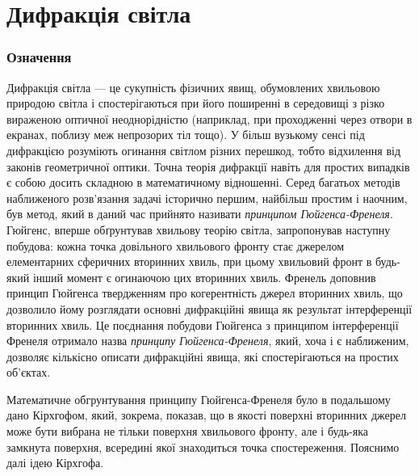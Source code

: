 
\part{Дифракція світла}

\nocite{akhmanov, Godzhaev}
\printbibliography[title={Рекомендована література}, heading=subbibliography]

\section{Означення}

Дифракція світла --- це сукупність фізичних явищ, обумовлених хвильовою природою світла і спостерігаються при його поширенні в середовищі з різко вираженою оптичної неоднорідністю (наприклад, при проходженні через отвори в екранах, поблизу меж непрозорих тіл тощо). У більш вузькому сенсі під дифракцією розуміють огинання світлом різних перешкод, тобто відхилення від законів геометричної оптики. Точна теорія дифракції навіть для простих випадків є собою досить складною в математичному відношенні. Серед багатьох методів наближеного розв'язання задачі історично першим, найбільш простим і наочним, був метод, який в даний час прийнято називати \emph{принципом Гюйгенса-Френеля}. Гюйгенс, вперше обґрунтував хвильову теорію світла, запропонував наступну побудова: кожна точка довільного хвильового фронту стає джерелом елементарних сферичних вторинних хвиль, при цьому хвильовий фронт в будь-який інший момент є огинаючою цих вторинних хвиль. Френель доповнив принцип Гюйгенса твердженням про когерентність джерел вторинних хвиль, що дозволило йому розглядати основні дифракційні явища як результат інтерференції вторинних хвиль. Це поєднання побудови Гюйгенса з принципом інтерференції Френеля отримало назва \emph{принципу Гюйгенса-Френеля}, який, хоча і є наближеним, дозволяє кількісно описати дифракційні явища, які спостерігаються на простих об'єктах.

Математичне обгрунтування принципу Гюйгенса-Френеля було в подальшому дано Кірхгофом, який, зокрема, показав, що в якості поверхні вторинних джерел може бути вибрана не тільки поверхня хвильового фронту, але і будь-яка замкнута поверхня, всередині якої знаходиться точка спостереження. Пояснимо далі ідею Кірхгофа.

